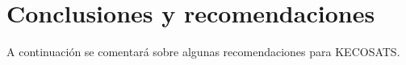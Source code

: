 \documentclass[12pt,lettersize,oneside]{article}
\begin{document}

\section{Conclusiones y recomendaciones}

A continuación se comentará sobre algunas recomendaciones para KECOSATS.
\end{document}
